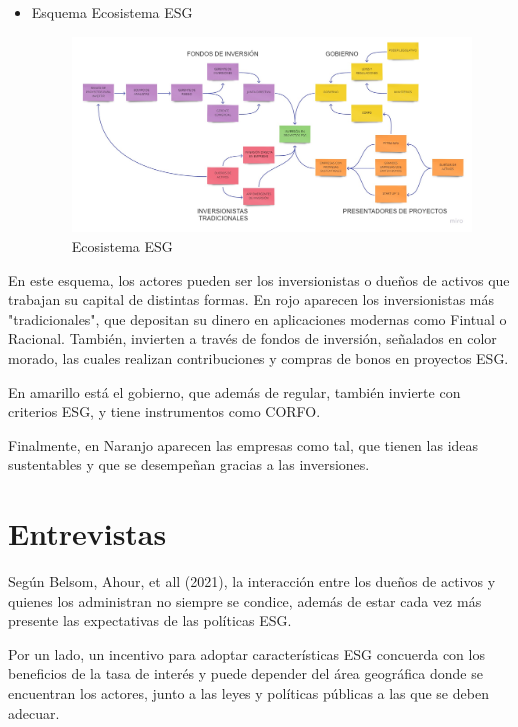 \documentclass[11pt,letterpaper]{article}
\begin{document}
\begin{itemize}
    \item Esquema Ecosistema ESG
        \begin{figure}[h]
            \centering
            \includegraphics[scale=0.2]{Concept Map - Frame 1.jpg}
            \caption{Ecosistema ESG}
        \end{figure}
\end{itemize}

En este esquema, los actores pueden ser los inversionistas o dueños de activos que trabajan su capital de distintas formas. En rojo aparecen los inversionistas más "tradicionales", que depositan su dinero en aplicaciones modernas como Fintual o Racional. También, invierten a través de fondos de inversión, señalados en color morado, las cuales realizan contribuciones y compras de bonos en proyectos ESG.

En amarillo está el gobierno, que además de regular, también invierte con criterios ESG, y tiene instrumentos como CORFO. 

Finalmente, en Naranjo aparecen las empresas como tal, que tienen las ideas sustentables y que se desempeñan gracias a las inversiones.



\section{Entrevistas}

Según Belsom, Ahour, et all (2021), la interacción entre los dueños de activos y quienes los administran no siempre se condice, además de estar cada vez más presente las expectativas de las políticas ESG.

Por un lado, un incentivo para adoptar características ESG concuerda con los beneficios de la tasa de interés y puede depender del área geográfica donde se encuentran los actores, junto a las leyes y políticas públicas a las que se deben adecuar. 
\end{document}
